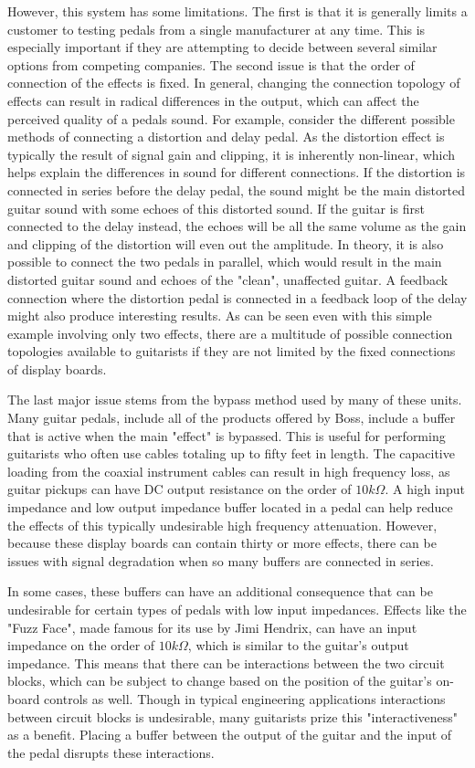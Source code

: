 However, this system has some limitations.  The first is that it is generally limits a customer to testing pedals from a single manufacturer at any time.  This is especially important if they are attempting to decide between several similar options from competing companies.  The second issue is that the order of connection of the effects is fixed.  In general, changing the connection topology of effects can result in radical differences in the output, which can affect the perceived quality of a pedals sound.  For example, consider the different possible methods of connecting a distortion and delay pedal.  As the distortion effect is typically the result of signal gain and clipping, it is inherently non-linear, which helps explain the differences in sound for different connections.  If the distortion is connected in series before the delay pedal, the sound might be the main distorted guitar sound with some echoes of this distorted sound.  If the guitar is first connected to the delay instead, the echoes will be all the same volume as the gain and clipping of the distortion will even out the amplitude.  In theory, it is also possible to connect the two pedals in parallel, which would result in the main distorted guitar sound and echoes of the "clean", unaffected guitar.  A feedback connection where the distortion pedal is connected in a feedback loop of the delay might also produce interesting results.  As can be seen even with this simple example involving only two effects, there are a multitude of possible connection topologies available to guitarists if they are not limited by the fixed connections of display boards.

The last major issue stems from the bypass method used by many of these units.  Many guitar pedals, include all of the products offered by Boss, include a buffer that is active when the main "effect" is bypassed.  This is useful for performing guitarists who often use cables totaling up to fifty feet in length.  The capacitive loading from the coaxial instrument cables can result in high frequency loss, as guitar pickups can have DC output resistance on the order of $10k\Omega$.  A high input impedance and low output impedance buffer located in a pedal can help reduce the effects of this typically undesirable high frequency attenuation.  However, because these display boards can contain thirty or more effects, there can be issues with signal degradation when so many buffers are connected in series.

In some cases, these buffers can have an additional consequence that can be undesirable for certain types of pedals with low input impedances.  Effects like the "Fuzz Face", made famous for its use by Jimi Hendrix, can have an input impedance on the order of $10k\Omega$, which is similar to the guitar's output impedance.  This means that there can be interactions between the two circuit blocks, which can be subject to change based on the position of the guitar's on-board controls as well.  Though in typical engineering applications interactions between circuit blocks is undesirable, many guitarists prize this "interactiveness" as a benefit.  Placing a buffer between the output of the guitar and the input of the pedal disrupts these interactions.

